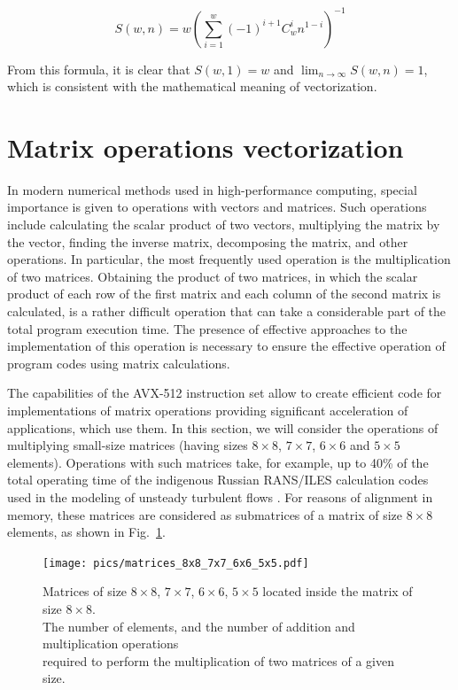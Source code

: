\documentclass[
11pt,%
tightenlines,%
twoside,%
onecolumn,%
nofloats,%
nobibnotes,%
nofootinbib,%
superscriptaddress,%
noshowpacs,%
centertags]%
{revtex4}
\begin{document}
\begin{equation}
S(w, n) = w \left( \sum_{i = 1}^{w}{(-1)^{i + 1} C_{w}^{i} n^{1 - i}} \right)^{-1}
\end{equation}

From this formula, it is clear that $S(w, 1) = w$ and $\lim_{n \to \infty}{S(w, n)} = 1$, which is consistent with the mathematical meaning of vectorization.

\section{Matrix operations vectorization}

In modern numerical methods used in high-performance computing, special importance is given to operations with vectors and matrices.
Such operations include calculating the scalar product of two vectors, multiplying the matrix by the vector, finding the inverse matrix, decomposing the matrix, and other operations.
In particular, the most frequently used operation is the multiplication of two matrices.
Obtaining the product of two matrices, in which the scalar product of each row of the first matrix and each column of the second matrix is calculated, is a rather difficult operation that can take a considerable part of the total program execution time.
The presence of effective approaches to the implementation of this operation is necessary to ensure the effective operation of program codes using matrix calculations.

The capabilities of the AVX-512 instruction set allow to create efficient code for implementations of matrix operations providing significant acceleration of  applications, which use them.
In this section, we will consider the operations of multiplying small-size matrices (having sizes $8 \times 8$, $7 \times 7$, $6 \times 6$ and $5 \times 5$ elements).
Operations with such matrices take, for example, up to 40\% of the total operating time of the indigenous Russian RANS/ILES calculation codes used in the modeling of unsteady turbulent flows \cite{Lyub_RANS_ILES, Ben_Lyub_Chest_RANS_ILES}.
For reasons of alignment in memory, these matrices are considered as submatrices of a matrix of size $8 \times 8$ elements, as shown in Fig.~\ref{fig:matrices_8x8_7x7_6x6_5x5}.

\begin{figure}[h]
\setcaptionmargin{5mm}
\onelinecaptionsfalse %
\texttt{[image: pics/matrices\_8x8\_7x7\_6x6\_5x5.pdf]}
\caption{Matrices of size $8 \times 8$, $7 \times 7$, $6 \times 6$, $5 \times 5$ located inside the matrix of size $8 \times 8$. \\ The number of elements, and the number of addition and multiplication operations \\ required to perform the multiplication of two matrices of a given size.}\label{fig:matrices_8x8_7x7_6x6_5x5}
\end{figure}
\end{document}
